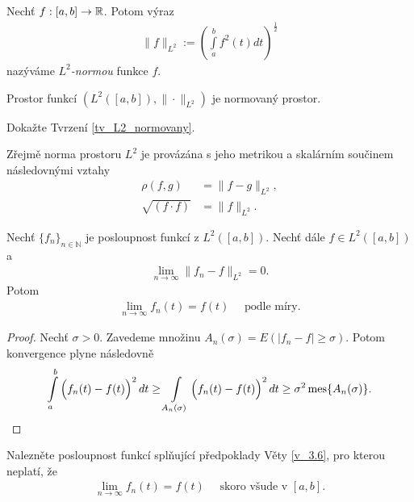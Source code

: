 \begin{definition}[$L^2$-norma]
Nechť $f:[a,b] \to \mathbb{R}$. Potom výraz
\begin{align*}
\|f\|_{L^2} := \left( \int \limits_a^b f^2(t) dt \right)^{\frac{1}{2}}
\end{align*}
nazýváme \textit{$L^2$-normou} funkce $f$.
\end{definition}
\begin{tvrz}
\label{tv_L2_normovany}
Prostor funkcí $(L^2([a,b]),\|\cdot \|_{L^2})$ je normovaný prostor. 
\end{tvrz}
\begin{uloha}
Dokažte Tvrzení \ref{tv_L2_normovany}.
\end{uloha}
\begin{poznamka}
Zřejmě norma prostoru $L^2$ je provázána s jeho metrikou a skalárním součinem následovnými vztahy
\begin{align*}
\rho(f,g)&=\|f-g\|_{L^2}, \\
\sqrt{(f \cdot f)}&= \|f\|_{L^2}.
\end{align*}
\end{poznamka}



\begin{theorem}
\label{v_3.6}
Nechť $\{f_n\}_{n \in \mathbb{N}}$ je posloupnost funkcí z $ L^2 ([a,b])$. Nechť dále $f \in L^2 ([a,b])$ a 
\begin{align*}
\lim_{n \rightarrow \infty} \| f_n - f \|_{L^2} = 0.
\end{align*}
Potom
\begin{align*}
\lim_{n \rightarrow \infty} f_n(t) = f(t) \quad \textrm{ podle míry.}
\end{align*}
\end{theorem}

\begin{proof}
Nechť $\sigma > 0$. Zavedeme množinu $A_n (\sigma) = E (|f_n - f| \geq \sigma)$. Potom konvergence plyne následovně
\begin{align*}
\int \limits_a^b \Big(f_n(t) - f(t)\Big)^2 \, dt \geq \int \limits_{A_n (\sigma)} \Big(f_n(t) - f(t)\Big)^2 \, dt \geq \sigma^2 \operatorname{mes}\{A_n (\sigma)\}.
\end{align*}
\end{proof}

\begin{uloha}
Nalezněte posloupnost funkcí splňující předpoklady Věty \ref{v_3.6}, pro kterou neplatí, že 
\begin{align*}
\lim_{n \rightarrow \infty} f_n(t) = f(t) \quad \textrm{ skoro všude v } [a,b]. 
\end{align*}
\end{uloha}





